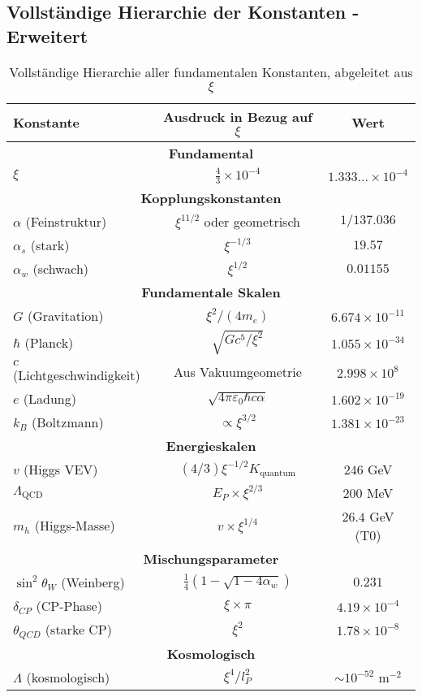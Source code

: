 \documentclass[12pt,a4paper]{article}
\newcommand{\lP}{l_P}
\newcommand{\xipar}{\xi}
\begin{document}
	\subsection{Vollständige Hierarchie der Konstanten - Erweitert}
	
	\begin{table}[h]
		\centering
		\small
		\begin{tabular}{lcc}
			\toprule
			\textbf{Konstante} & \textbf{Ausdruck in Bezug auf $\xipar$} & \textbf{Wert} \\
			\midrule
			\multicolumn{3}{c}{\textbf{Fundamental}} \\
			$\xipar$ & $\frac{4}{3} \times 10^{-4}$ & $1.333... \times 10^{-4}$ \\
			\midrule
			\multicolumn{3}{c}{\textbf{Kopplungskonstanten}} \\
			$\alpha$ (Feinstruktur) & $\xipar^{11/2}$ oder geometrisch & $1/137.036$ \\
			$\alpha_s$ (stark) & $\xipar^{-1/3}$ & $19.57$ \\
			$\alpha_w$ (schwach) & $\xipar^{1/2}$ & $0.01155$ \\
			\midrule
			\multicolumn{3}{c}{\textbf{Fundamentale Skalen}} \\
			$G$ (Gravitation) & $\xipar^2/(4m_e)$ & $6.674 \times 10^{-11}$ \\
			$\hbar$ (Planck) & $\sqrt{Gc^5/\xipar^2}$ & $1.055 \times 10^{-34}$ \\
			$c$ (Lichtgeschwindigkeit) & Aus Vakuumgeometrie & $2.998 \times 10^8$ \\
			$e$ (Ladung) & $\sqrt{4\pi\varepsilon_0\hbar c\alpha}$ & $1.602 \times 10^{-19}$ \\
			$k_B$ (Boltzmann) & $\propto \xipar^{3/2}$ & $1.381 \times 10^{-23}$ \\
			\midrule
			\multicolumn{3}{c}{\textbf{Energieskalen}} \\
			$v$ (Higgs VEV) & $(4/3)\xipar^{-1/2}K_{\text{quantum}}$ & $246$ GeV \\
			$\Lambda_{\text{QCD}}$ & $E_P \times \xipar^{2/3}$ & $200$ MeV \\
			$m_h$ (Higgs-Masse) & $v \times \xipar^{1/4}$ & $26.4$ GeV (T0) \\
			\midrule
			\multicolumn{3}{c}{\textbf{Mischungsparameter}} \\
			$\sin^2\theta_W$ (Weinberg) & $\frac{1}{4}(1-\sqrt{1-4\alpha_w})$ & $0.231$ \\
			$\delta_{CP}$ (CP-Phase) & $\xipar \times \pi$ & $4.19 \times 10^{-4}$ \\
			$\theta_{QCD}$ (starke CP) & $\xipar^2$ & $1.78 \times 10^{-8}$ \\
			\midrule
			\multicolumn{3}{c}{\textbf{Kosmologisch}} \\
			$\Lambda$ (kosmologisch) & $\xipar^4/\lP^2$ & $\sim 10^{-52}$ m$^{-2}$ \\
			\bottomrule
		\end{tabular}
		\caption{Vollständige Hierarchie aller fundamentalen Konstanten, abgeleitet aus $\xipar$}
	\end{table}
	
\end{document}
